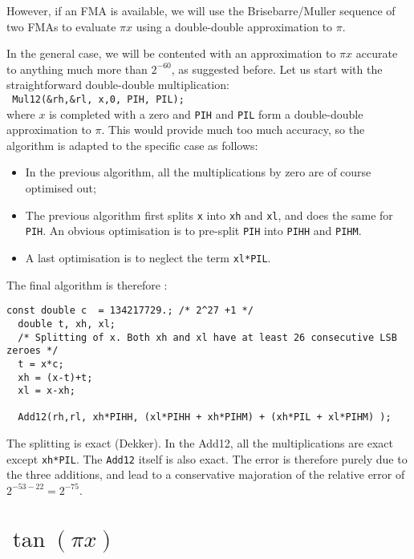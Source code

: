 However, if an FMA is available, we will use the Brisebarre/Muller sequence of two
FMAs to evaluate $\pi x$ using  a double-double
approximation to $\pi$.

In the general case, we will be contented with an approximation to
$\pi x$ accurate to anything much more than $2^{-60}$, as suggested
before. Let us start with the straightforward double-double multiplication:\\
\texttt{ Mul12(\&rh,\&rl, x,0, PIH, PIL);}\\
where $x$ is completed with a zero and \texttt{PIH} and \texttt{PIL}
form a double-double approximation to $\pi$. This would provide much
too much accuracy, so the algorithm is adapted to the specific case as
follows:
\begin{itemize}
\item In the previous algorithm, all the multiplications by zero are of course optimised out;
\item The previous algorithm first splits \texttt{x} into \texttt{xh}
  and \texttt{xl}, and does the same for \texttt{PIH}. An obvious
  optimisation is to pre-split \texttt{PIH} into \texttt{PIHH} and
  \texttt{PIHM}.
\item A last optimisation is to neglect the term \texttt{xl*PIL}.
\end{itemize}

The final algorithm is therefore :
\begin{lstlisting}[caption={Multiplication by $\pi$ \label{lst:trigpi:pix}},firstnumber=1]
  const double c  = 134217729.; /* 2^27 +1 */   
  double t, xh, xl;                           
  /* Splitting of x. Both xh and xl have at least 26 consecutive LSB zeroes */
  t = x*c;     
  xh = (x-t)+t;
  xl = x-xh;   

  Add12(rh,rl, xh*PIHH, (xl*PIHH + xh*PIHM) + (xh*PIL + xl*PIHM) );               
\end{lstlisting}

The splitting is exact (Dekker). In the Add12, all the multiplications
are exact except \texttt{xh*PIL}. The \texttt{Add12} itself is also
exact. The error is therefore purely due to the three additions, and
lead to a conservative majoration of the relative error of $2^{-53-22}
= 2^{-75}$. 



\section{$\tan(\pi x)$}

